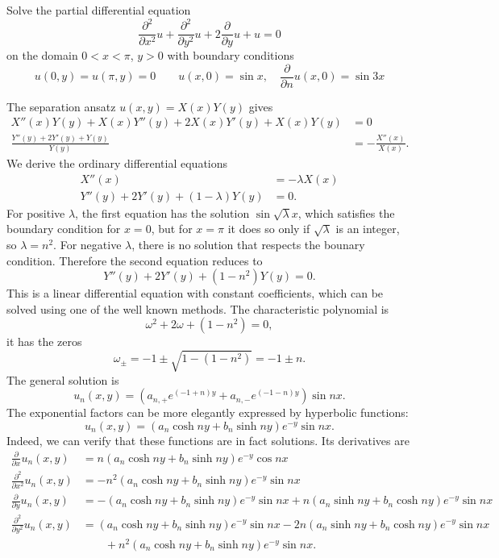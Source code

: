 Solve the partial differential equation
\[
\frac{\partial^2}{\partial x^2}u+\frac{\partial^2}{\partial y^2}u
+2\frac{\partial }{\partial y}u+u=0
\]
on the domain $0 < x < \pi$, $y > 0$ with boundary conditions
\[
u(0,y)=u(\pi,y)=0
\quad
\quad
u(x,0)=\sin x,\quad \frac{\partial }{\partial n}u(x,0)=\sin 3x
\]

\begin{loesung}
The separation ansatz $u(x,y)=X(x)Y(y)$ gives
\begin{align*}
X''(x)Y(y)+X(x)Y''(y)+2X(x)Y'(y)+X(x)Y(y)&=0
\\
\frac{Y''(y)+2Y'(y)+Y(y)}{Y(y)}
&=
-\frac{X''(x)}{X(x)}.
\end{align*}
We derive the ordinary differential equations
\begin{align*}
X''(x)&=-\lambda X(x)\\
Y''(y)+2Y'(y)+(1-\lambda)Y(y)&=0.
\end{align*}
For positive $\lambda$, the first equation has the solution
$\sin\sqrt{\lambda}x$, which satisfies the boundary condition for $x=0$,
but for $x=\pi$ it does so only if $\sqrt{\lambda}$ is an integer, so
$\lambda=n^2$.
For negative $\lambda$, there is no solution that respects the bounary
condition.
Therefore the second equation reduces to
\[
Y''(y)+2Y'(y)+(1-n^2)Y(y)=0.
\]
This is a linear differential equation with constant coefficients,
which can be solved using one of the well known methods.
The characteristic polynomial is
\[
\omega^2+2\omega+(1-n^2)=0,
\]
it has the zeros
\[
\omega_{\pm}=-1\pm{\sqrt{1-(1-n^2)}}=-1\pm n.
\]
The general solution is
\[
u_n(x,y)=(a_{n,+}e^{(-1+n)y}+a_{n,-}e^{(-1-n)y})\sin nx.
\]
The exponential factors can be more elegantly expressed by hyperbolic
functions:
\[
u_n(x,y)=(a_n\cosh ny+b_n\sinh ny)e^{-y}\sin nx.
\]
Indeed, we can verify that these functions are in fact solutions.
Its derivatives are
\begin{align*}
\frac{\partial}{\partial x}u_n(x,y)
&=
n (a_n\cosh ny+b_n\sinh ny)e^{-y}\cos nx
\\
\frac{\partial^2}{\partial x^2}u_n(x,y)
&=
-n^2 (a_n\cosh ny+b_n\sinh ny)e^{-y}\sin nx
\\
\frac{\partial}{\partial y}u_n(x,y)
&=
-(a_n\cosh ny+b_n\sinh ny)e^{-y}\sin nx
+
n(a_n\sinh ny+b_n\cosh ny)e^{-y}\sin nx
\\
\frac{\partial^2}{\partial y^2}u_n(x,y)
&=
(a_n\cosh ny+b_n\sinh ny)e^{-y}\sin nx
-2n(a_n\sinh ny+b_n\cosh ny)e^{-y}\sin nx
\\
&\qquad
+n^2(a_n\cosh ny+b_n\sinh ny)e^{-y}\sin nx.
\end{align*}

\end{loesung}
